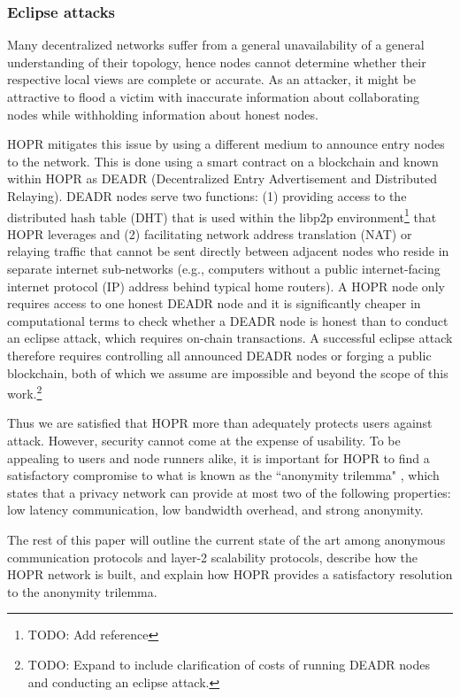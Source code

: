 \subsubsection{Eclipse attacks}
Many decentralized networks suffer from a general unavailability of a general understanding of their topology, hence nodes cannot determine whether their respective local views are complete or accurate. As an attacker, it might be attractive to flood a victim with inaccurate information about collaborating nodes while withholding information about honest nodes.

HOPR mitigates this issue by using a different medium to announce entry nodes to the network. This is done using a smart contract on a blockchain and known within HOPR as DEADR (Decentralized Entry Advertisement and Distributed Relaying). DEADR nodes serve two functions: (1) providing access to the distributed hash table (DHT) that is used within the libp2p environment\footnote{TODO: Add reference} that HOPR leverages and (2) facilitating network address translation (NAT) or relaying traffic that cannot be sent directly between adjacent nodes who reside in separate internet sub-networks (e.g., computers without a public internet-facing internet protocol (IP) address behind typical home routers). A HOPR node only requires access to one honest DEADR node and it is significantly cheaper in computational terms to check whether a DEADR node is honest than to conduct an eclipse attack, which requires on-chain transactions. A successful eclipse attack therefore requires controlling all announced DEADR nodes or forging a public blockchain, both of which we assume are impossible and beyond the scope of this work.\footnote{TODO: Expand to include clarification of costs of running DEADR nodes and conducting an eclipse attack.}

Thus we are satisfied that HOPR more than adequately protects users against attack. However, security cannot come at the expense of usability. To be appealing to users and node runners alike, it is important for HOPR to find a satisfactory compromise to what is known as the ``anonymity trilemma" \cite{AnonymityTrilemma}, which states that a privacy network can provide at most two of the following properties: low latency communication, low bandwidth overhead, and strong anonymity.

The rest of this paper will outline the current state of the art among anonymous communication protocols and layer-2 scalability protocols, describe how the HOPR network is built, and explain how HOPR provides a satisfactory resolution to the anonymity trilemma.
